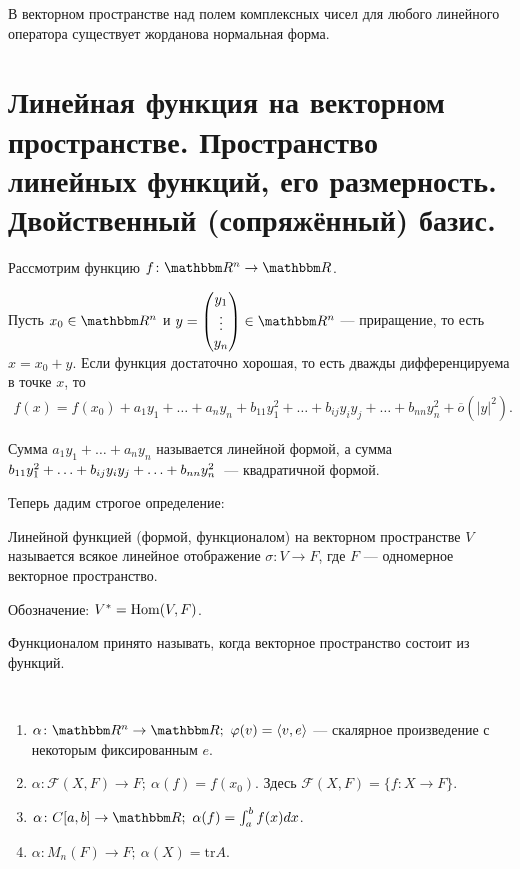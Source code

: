 \begin{Consequence}
В векторном пространстве над полем комплексных чисел для любого линейного оператора существует жорданова нормальная форма.
\end{Consequence}

\section{Линейная функция на векторном пространстве. Пространство линейных функций, его размерность. Двойственный (сопряжённый) базис.}

Рассмотрим функцию $f \colon \R^n \rightarrow \R$.

Пусть $x_0 \in \R^n$ и $y = \begin{pmatrix}y_1 \\ \vdots \\ y_n\end{pmatrix} \in\R^n$ --- приращение, то есть $x = x_0 + y$. Если функция достаточно хорошая, то есть дважды дифференцируема в точке $x$, то
\begin{gather*}
f(x) = f(x_0) + a_1y_1 + \ldots + a_ny_n + b_{11}y_1^2 + \ldots + b_{ij}y_iy_j +\ldots + b_{nn}y_n^2 + \overline{o}(|y|^2).
\end{gather*}

Сумма $a_1y_1 + \ldots + a_ny_n$ называется линейной формой, а сумма $b_{11}y_1^2 + \ldots \hm+ b_{ij}y_iy_j + \ldots + b_{nn}y_n^2$~--- квадратичной формой.

Теперь дадим строгое определение:
\begin{Def}
Линейной функцией (формой, функционалом) на векторном пространстве $V$ называется всякое линейное отображение $\sigma \colon V \rightarrow F$, где $F$ --- одномерное векторное пространство. 

Обозначение: $V^* = \mathrm{Hom}(V, F)$.
\end{Def}

\begin{Comment}
Функционалом принято называть, когда векторное пространство состоит из функций.
\end{Comment}

\begin{Examples}\
\begin{enumerate}
\item $\alpha \colon \R^n \rightarrow \R;\ \phi(v) = \langle v, e \rangle$ --- скалярное произведение с некоторым фиксированным $e$.
\item $\alpha \colon \mathcal{F}(X, F) \rightarrow F;\ \alpha(f) = f(x_0)$. Здесь $\mathcal{F}(X, F) = \{f \colon X \rightarrow F  \}$.
\item $\alpha \colon C[a, b] \rightarrow \R;\ \alpha(f) = \int_a^b f(x) dx$.
\item $\alpha \colon M_n(F) \rightarrow F;\ \alpha(X) = \mathrm{tr}A$.
\end{enumerate}
\end{Examples}

